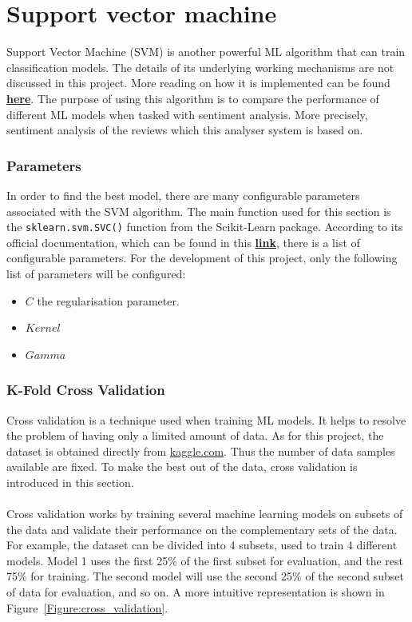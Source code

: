 \documentclass[a4paper]{report}
\newcommand{\code}[1]{\texttt{#1}}
\begin{document}
{{\section{Support vector machine}
Support Vector Machine (SVM) is another powerful ML algorithm that can train classification models. The details of its underlying working mechanisms are not discussed in this project. More reading on how it is implemented can be found \href{https://en.wikipedia.org/wiki/Support-vector_machine}{\textbf{here}}. The purpose of using this algorithm is to compare the performance of different ML models when tasked with sentiment analysis. More precisely, sentiment analysis of the reviews which this analyser system is based on.

\subsubsection{Parameters}
In order to find the best model, there are many configurable parameters associated with the SVM algorithm. The main function used for this section is the \code{sklearn.svm.SVC()} function from the Scikit-Learn package. According to its official documentation, which can be found in this \href{https://scikit-learn.org/stable/modules/generated/sklearn.svm.SVC.html#sklearn.svm.SVC}{\textbf{link}}, there is a list of configurable parameters. For the development of this project, only the following list of parameters will be configured:

\begin{itemize}
	\item \(C\) the regularisation parameter.
	\item \(Kernel\)
	\item \(Gamma\)
\end{itemize}

\subsubsection{K-Fold Cross Validation}
Cross validation is a technique used when training ML models. It helps to resolve the problem of having only a limited amount of data. As for this project, the dataset is obtained directly from  \url{kaggle.com}. Thus the number of data samples available are fixed. To make the best out of the data, cross validation is introduced in this section.
\\\\
Cross validation works by training several machine learning models on subsets of the data and validate their performance on the complementary sets of the data. For example, the dataset can be divided into 4 subsets, used to train 4 different models. Model 1 uses the first 25\% of the first subset for evaluation, and the rest 75\% for training. The second model will use the second 25\% of the second subset of data for evaluation, and so on. A more intuitive representation is shown in Figure~\ref{Figure:cross_validation}.\\

}}
\end{document}
